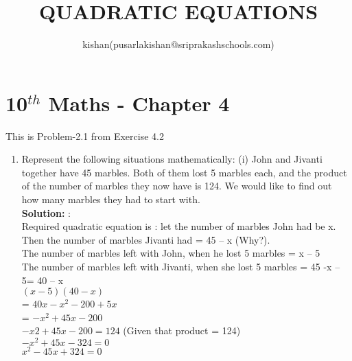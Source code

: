 \documentclass[10pt]{article}
\title{QUADRATIC EQUATIONS}
\author{kishan(pusarlakishan@sriprakashschools.com)}
\newcommand{\solution}{\noindent \textbf{Solution: }}
\begin{document}
    \maketitle
    \section*{10$^{th}$ Maths - Chapter 4}
    This is Problem-2.1 from Exercise 4.2
    \begin{enumerate}
    \item Represent the following situations mathematically:
(i) John and Jivanti together have 45 marbles. Both of them lost 5 marbles each, and
the product of the number of marbles they now have is 124. We would like to find
out how many marbles they had to start with.\\
\solution:\\Required quadratic equation is :
let the number of marbles John had be x.\\
Then the number of marbles Jivanti had = 45 – x (Why?).\\
The number of marbles left with John, when he lost 5 marbles = x – 5\\
The number of marbles left with Jivanti, when she lost 5 marbles = 45 -x – 5= 40 – x\\
${(x-5)(40-x)}$\\
= ${40x-x^2-200+5x}$\\
= ${-x^2+45x-200}$\\
 ${-x2+45x-200 = 124}$ (Given that product = 124)\\
 ${-x^2+45x-324=0}$\\
 ${x^2-45x+324=0}$


\end{enumerate}
\end{document}

